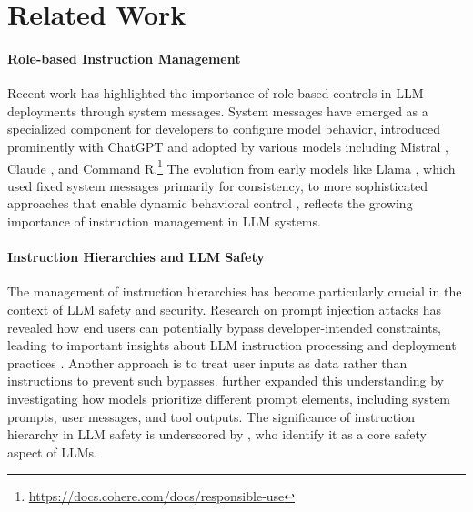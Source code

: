 \section{Related Work}

\paragraph{Role-based Instruction Management}

Recent work has highlighted the importance of role-based controls in LLM deployments through system messages. System messages have emerged as a specialized component for developers to configure model behavior, introduced prominently with ChatGPT \citep{achiam2023gpt} and adopted by various models including Mistral \citep{jiang2024mixtralexperts}, Claude \citep{claude21modelcard}, and Command R.\footnote{\url{https://docs.cohere.com/docs/responsible-use}} The evolution from early models like Llama \citep{touvron2023llama}, which used fixed system messages primarily for consistency, to more sophisticated approaches that enable dynamic behavioral control \citep{kung2023models,lee2024aligningthousandspreferencesmessage}, reflects the growing importance of instruction management in LLM systems.

\paragraph{Instruction Hierarchies and LLM Safety}
The management of instruction hierarchies has become particularly crucial in the context of LLM safety and security. Research on prompt injection attacks has revealed how end users can potentially bypass developer-intended constraints, leading to important insights about LLM instruction processing and deployment practices \citep{wu2024instructional,Hines2024DefendingAI, toyer2023tensor}. 
Another approach is to treat user inputs as data rather than instructions \citep{Chen2024StruQDA,liu2023prompt,zverev2024can} to prevent such bypasses. \citet{wallace2024instruction} further expanded this understanding by investigating how models prioritize different prompt elements, including system prompts, user messages, and tool outputs. The significance of instruction hierarchy in LLM safety is underscored by \citet{li2024libraleaderboardresponsibleaibalanced}, who identify it as a core safety aspect of LLMs.